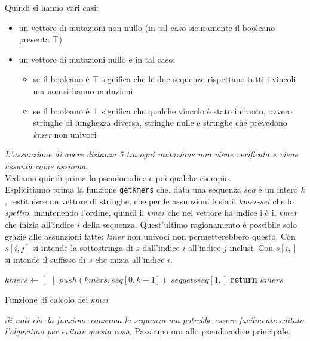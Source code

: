 \documentclass[a4paper,12pt, oneside]{book}
\begin{document}
Quindi si hanno vari casi:
\begin{itemize}
  \item un vettore di mutazioni non nullo (in tal caso sicuramente il booleano
  presenta $\top$)
  \item un vettore di mutazioni nullo e in tal caso:
  \begin{itemize}
    \item se il booleano è $\top$ significa che le due sequenze rispettano tutti
    i vincoli ma non si hanno mutazioni
    \item se il booleano è $\bot$ significa che qualche vincolo è stato
    infranto, ovvero stringhe di lunghezza diversa, stringhe nulle e stringhe
    che prevedono \textit{kmer} non univoci
  \end{itemize}
\end{itemize}
\textit{L'assunzione di avere distanza 5 tra ogni mutazione non viene verificata
  e viene assunta come assioma}.\\
Vediamo quindi prima lo pseudocodice e poi qualche esempio.\\
Esplicitiamo prima la funzione \texttt{getKmers} che, data una sequenza $seq$ e
un intero $k$, restituisce un vettore di stringhe, che per le assunzioni è sia
il \textit{kmer-set} che lo \textit{spettro}, mantenendo l'ordine, quindi il
\textit{kmer} che nel vettore ha indice i è il \textit{kmer} che inizia
all'indice $i$ della sequenza. Quest'ultimo ragionamento è possibile solo grazie
alle assunzioni fatte: \textit{kmer} non univoci non permetterebbero questo. Con
$s[i,j]$ si intende la sottostringa di $s$ dall'indice $i$ all'indice $j$
inclusi. Con $s[i,]$ si intende il suffisso di $s$ che inizia all'indice $i$.
\begin{algorithm}[H]
  \begin{algorithmic}
    \State $kmers \gets [\,\,\,]$
    \State $push(kmers, seq[0,k-1])$
    \State $seq gets seq[1,]$
    \EndWhile
    \State \textbf{return} $kmers$
    \EndFunction
  \end{algorithmic}
  \caption{Funzione di calcolo dei \textit{kmer}}
\end{algorithm}
\textit{Si noti che la funzione consuma la sequenza ma potrebbe essere
  facilmente editato l'algoritmo per evitare questa cosa}.
\newpage
Passiamo ora allo pseudocodice principale.
\end{document}
